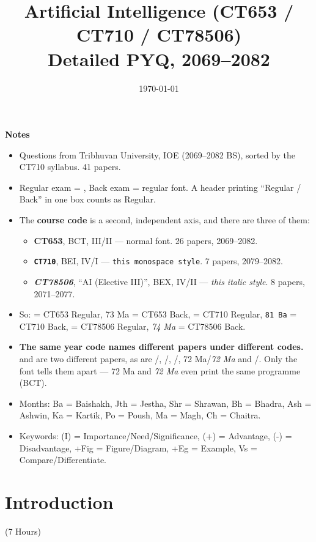 \documentclass[12pt]{article}
\title{Artificial Intelligence (CT653 / CT710 / CT78506)\\[0.4em]\large Detailed PYQ, 2069--2082}
\author{}
\date{\today}
\begin{document}
\maketitle
\vspace{5cm}
\textbf{Notes}
\begin{itemize}[noitemsep]
  \item Questions from Tribhuvan University, IOE (2069--2082 BS), sorted by the CT710 syllabus. 41 papers.
  \item Regular exam = , Back exam = regular font. A header printing ``Regular / Back'' in one box counts as Regular.
  \item The \textbf{course code} is a second, independent axis, and there are three of them:
  \begin{itemize}[noitemsep]
    \item \textbf{CT653}, BCT, III/II --- normal font. 26 papers, 2069--2082.
    \item \texttt{\textbf{CT710}}, BEI, IV/I --- \texttt{this monospace style}. 7 papers, 2079--2082.
    \item \textit{\textbf{CT78506}}, ``AI (Elective III)'', BEX, IV/II --- \textit{this italic style}. 8 papers, 2071--2077.
  \end{itemize}
  \item So:  = CT653 Regular, 73 Ma = CT653 Back,  = CT710 Regular, \texttt{81 Ba} = CT710 Back,  = CT78506 Regular, \textit{74 Ma} = CT78506 Back.
  \item \textbf{The same year code names different papers under different codes.}  and  are two different papers, as are /, /, /, 72 Ma/\textit{72 Ma} and /. Only the font tells them apart --- 72 Ma and \textit{72 Ma} even print the same programme (BCT).
  \item Months: Ba = Baishakh, Jth = Jestha, Shr = Shrawan, Bh = Bhadra, Ash = Ashwin, Ka = Kartik, Po = Poush, Ma = Magh, Ch = Chaitra.
  \item Keywords: (I) = Importance/Need/Significance, (+) = Advantage, (-) = Disadvantage, +Fig = Figure/Diagram, +Eg = Example, Vs = Compare/Differentiate.
\end{itemize}
\pagebreak
\tableofcontents
\pagebreak

\section{Introduction}
\begin{center}(7 Hours)\end{center}
\end{document}
